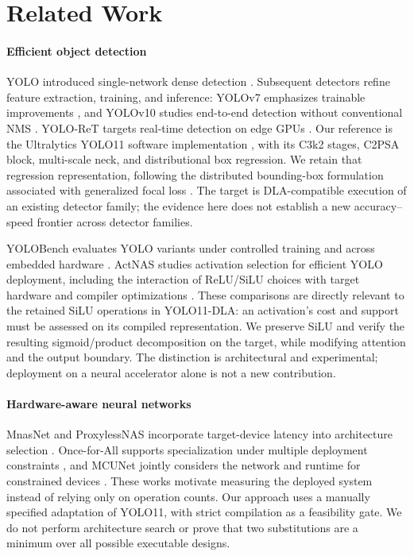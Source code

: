\section{Related Work}
\label{sec:related}
\paragraph*{Efficient object detection}
YOLO introduced single-network dense detection \cite{redmon2016yolo}.
Subsequent detectors refine feature extraction, training, and inference:
YOLOv7 emphasizes trainable improvements \cite{wang2023yolov7}, and YOLOv10
studies end-to-end detection without conventional NMS \cite{wang2024yolov10}.
YOLO-ReT targets real-time detection on edge GPUs
\cite{ganesh2022yoloret}. Our reference is the Ultralytics YOLO11 software
implementation \cite{jocher2024yolo11}, with its C3k2 stages, C2PSA block,
multi-scale neck, and distributional box regression. We retain that regression
representation, following the distributed bounding-box formulation associated
with generalized focal loss \cite{li2020gfl}. The target is DLA-compatible
execution of an existing detector family; the evidence here does not establish
a new accuracy--speed frontier across detector families.

YOLOBench evaluates YOLO variants under controlled training and across embedded
hardware \cite{lazarevich2023yolobench}. ActNAS studies activation selection
for efficient YOLO deployment, including the interaction of ReLU/SiLU choices
with target hardware and compiler optimizations \cite{sah2025actnas}.
These comparisons are directly relevant to the retained SiLU operations in
YOLO11-DLA: an activation's cost and support must be assessed on its compiled
representation. We preserve SiLU and verify the resulting sigmoid/product
decomposition on the target, while modifying attention and the output boundary.
The distinction is architectural and experimental; deployment on a neural
accelerator alone is not a new contribution.

\paragraph*{Hardware-aware neural networks}
MnasNet and ProxylessNAS incorporate target-device latency into architecture
selection \cite{tan2019mnasnet,cai2019proxyless}. Once-for-All supports
specialization under multiple deployment constraints \cite{cai2020ofa}, and
MCUNet jointly considers the network and runtime for constrained devices
\cite{lin2020mcunet}. These works motivate measuring the deployed system
instead of relying only on operation counts. Our approach uses a manually
specified adaptation of YOLO11, with strict compilation as a feasibility gate.
We do not perform architecture search or prove that two substitutions are a
minimum over all possible executable designs.

